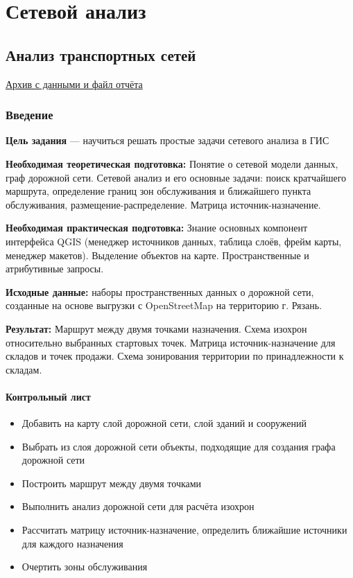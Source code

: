 \documentclass[
  12pt,
]{book}
\providecommand{\tightlist}{%
  \setlength{\itemsep}{0pt}\setlength{\parskip}{0pt}}
\begin{document}
\hypertarget{part-ux441ux435ux442ux435ux432ux43eux439-ux430ux43dux430ux43bux438ux437}{%
\part{Сетевой анализ}\label{part-ux441ux435ux442ux435ux432ux43eux439-ux430ux43dux430ux43bux438ux437}}

\hypertarget{networks}{%
\chapter{Анализ транспортных сетей}\label{networks}}

\href{https://1drv.ms/u/s!AmtmZDq3JgxHgZ0j1tgKv_d1ElUpow?e=s0gsKz}{Архив с данными и файл отчёта}

\hypertarget{networks-intro}{%
\section{Введение}\label{networks-intro}}

\textbf{Цель задания} --- научиться решать простые задачи сетевого анализа в ГИС

\textbf{Необходимая теоретическая подготовка:} Понятие о сетевой модели данных, граф дорожной сети. Сетевой анализ и его основные задачи: поиск кратчайшего маршрута, определение границ зон обслуживания и ближайшего пункта обслуживания, размещение-распределение. Матрица источник-назначение.

\textbf{Необходимая практическая подготовка:} Знание основных компонент интерфейса QGIS (менеджер источников данных, таблица слоёв, фрейм карты, менеджер макетов). Выделение объектов на карте. Пространственные и атрибутивные запросы.

\textbf{Исходные данные:} наборы пространственных данных о дорожной сети, созданные на основе выгрузки с OpenStreetMap на территорию г. Рязань.

\textbf{Результат:} Маршрут между двумя точками назначения. Схема изохрон относительно выбранных стартовых точек. Матрица источник-назначение для складов и точек продажи. Схема зонирования территории по принадлежности к складам.

\hypertarget{networks-control}{%
\subsection{Контрольный лист}\label{networks-control}}

\begin{itemize}
\tightlist
\item
  Добавить на карту слой дорожной сети, слой зданий и сооружений
\item
  Выбрать из слоя дорожной сети объекты, подходящие для создания графа дорожной сети
\item
  Построить маршрут между двумя точками
\item
  Выполнить анализ дорожной сети для расчёта изохрон
\item
  Рассчитать матрицу источник-назначение, определить ближайшие источники для каждого назначения
\item
  Очертить зоны обслуживания
\end{itemize}
\end{document}
